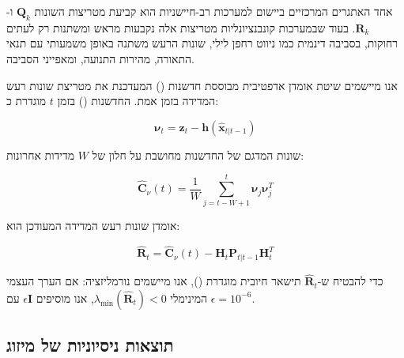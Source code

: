 אחד האתגרים המרכזיים ביישום  למערכות רב-חיישניות הוא קביעת מטריצות השונות $\mathbf{Q}_k$ ו-$\mathbf{R}_k$. בעוד שבמערכות קונבנציונליות מטריצות אלה נקבעות מראש ומשתנות רק לעתים רחוקות, בסביבה דינמית כמו ניווט רחפן לילי, שונות הרעש משתנה באופן משמעותי עם תנאי התאורה, מהירות התנועה, ומאפייני הסביבה.

אנו מיישמים שיטת אומדן אדפטיבית מבוססת חדשנות () המעדכנת את מטריצת שונות רעש המדידה בזמן אמת. החדשנות () בזמן $t$ מוגדרת כ:

\begin{equation}
\boldsymbol{\nu}_t = \mathbf{z}_t - \mathbf{h}(\hat{\mathbf{x}}_{t|t-1})
\label{eq:ch05_innovation}
\end{equation}

שונות המדגם של החדשנות מחושבת על חלון של $W$ מדידות אחרונות:

\begin{equation}
\hat{\mathbf{C}}_\nu(t) = \frac{1}{W} \sum_{j=t-W+1}^t \boldsymbol{\nu}_j \boldsymbol{\nu}_j^T
\label{eq:ch05_innovation_cov}
\end{equation}

אומדן שונות רעש המדידה המעודכן הוא:

\begin{equation}
\hat{\mathbf{R}}_t = \hat{\mathbf{C}}_\nu(t) - \mathbf{H}_t \mathbf{P}_{t|t-1} \mathbf{H}_t^T
\label{eq:ch05_adaptive_R}
\end{equation}

כדי להבטיח ש-$\hat{\mathbf{R}}_t$ תישאר חיובית מוגדרת (), אנו מיישמים נורמליזציה: אם הערך העצמי המינימלי $\lambda_{\min}(\hat{\mathbf{R}}_t) < 0$, אנו מוסיפים $\epsilon \mathbf{I}$ עם $\epsilon = 10^{-6}$.

\subsection{תוצאות ניסיוניות של מיזוג}
\label{sec:ch05_experimental}

\begin{table}[htbp]
\centering
\caption{השוואת אסטרטגיות מיזוג על מערך נתונים לילי. (Comparison of fusion strategies on nocturnal dataset.)}
\label{tab:ch05_fusion_comparison}
\end{table}

